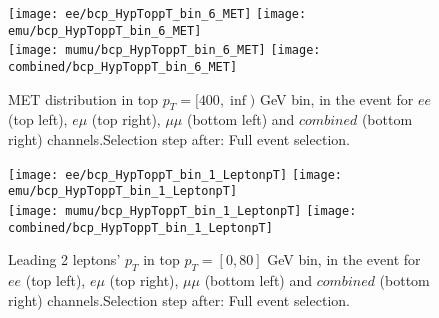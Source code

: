 \clearpage
\newpage

\begin{figure}
  \texttt{[image: ee/bcp\_HypToppT\_bin\_6\_MET]}
  \texttt{[image: emu/bcp\_HypToppT\_bin\_6\_MET]}\\
  \texttt{[image: mumu/bcp\_HypToppT\_bin\_6\_MET]}
  \texttt{[image: combined/bcp\_HypToppT\_bin\_6\_MET]}
\caption{MET distribution in top $p_T = [400,\inf)$ GeV bin, in the event for $ee$ (top left), $e\mu$ (top right), $\mu\mu$ (bottom left) and $combined$ (bottom right) channels.\newline Selection step after: Full event selection.}
\end{figure}

\clearpage
\newpage












% 

\begin{figure}
  \texttt{[image: ee/bcp\_HypToppT\_bin\_1\_LeptonpT]}
  \texttt{[image: emu/bcp\_HypToppT\_bin\_1\_LeptonpT]}\\
  \texttt{[image: mumu/bcp\_HypToppT\_bin\_1\_LeptonpT]}
  \texttt{[image: combined/bcp\_HypToppT\_bin\_1\_LeptonpT]}
\caption{Leading 2 leptons' $p_T$ in top $p_T = [0,80]$ GeV bin, in the event for $ee$ (top left), $e\mu$ (top right), $\mu\mu$ (bottom left) and $combined$ (bottom right) channels.\newline Selection step after: Full event selection.}
\end{figure}


